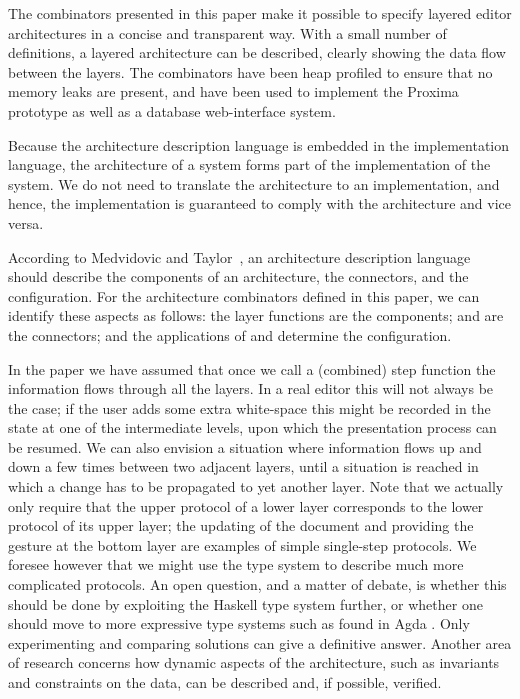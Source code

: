 \documentclass[preprint,natbib]{sigplanconf}
\begin{document}
The combinators presented in this paper make it possible to specify layered editor architectures in a concise and transparent way. With a small number of definitions, a layered architecture can be described, clearly showing the data flow between the layers. The combinators have been heap profiled to ensure that no memory leaks are present, and have been used to implement the Proxima prototype as well as a database web-interface system.

Because the architecture description language is embedded in the implementation language, the architecture of a system forms part of the implementation of the system. We do not need to translate the architecture to an implementation, and hence, the implementation is guaranteed to comply with the architecture and vice versa.

According to Medvidovic and Taylor~\cite{medvidovic00ADLs}, an architecture description language should describe the components of an architecture, the connectors, and the configuration. For the architecture combinators defined in this paper, we can identify these aspects as follows: the layer functions are the components;  and  are the connectors; and the applications of  and  determine the configuration.

In the paper we have assumed that once we call a (combined) step function the information flows through all the layers. In a real editor this will not always be the case; if the user adds some extra white-space this might be recorded in the state at one of the intermediate levels, upon which the presentation process can be resumed. We can also envision a situation where information flows up and down a few times between two adjacent layers, until a situation is reached in which a change has to be propagated to yet another layer. Note that we actually only require that the upper protocol of a lower layer corresponds to the lower protocol of its upper layer; the updating of the document and providing the gesture at the bottom layer are examples of simple single-step protocols. We foresee however that we might use the type system to describe much more complicated protocols. An open question, and a matter of debate, is whether this should be done by exploiting the Haskell type system further, or whether one should move to more expressive type systems such as found in Agda \cite{norell:thesis}. Only experimenting and comparing solutions can give a definitive answer. Another area of research concerns how dynamic aspects of the architecture, such as invariants and constraints on the data, can be described and, if possible, verified.
\end{document}
